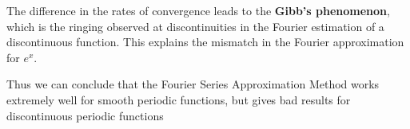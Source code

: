 \documentclass[11pt, a4paper, twoside]{article}
\begin{document}
The difference in the rates of convergence leads to the \textbf{Gibb's
phenomenon}, which is the ringing observed at discontinuities in the
Fourier estimation of a discontinuous function.
This explains the mismatch in the Fourier approximation for \(e^x\).

Thus we can conclude that the Fourier Series Approximation Method works extremely well
for smooth periodic functions, but gives bad results for discontinuous periodic functions
\end{document}
